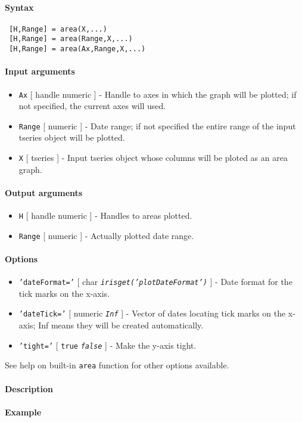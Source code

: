 


	\paragraph{Syntax}
 
 \begin{verbatim}
 [H,Range] = area(X,...)
 [H,Range] = area(Range,X,...)
 [H,Range] = area(Ax,Range,X,...)
 \end{verbatim}
 
 \paragraph{Input arguments}
 
 \begin{itemize}
 \item
   \texttt{Ax} {[} handle \textbar{} numeric {]} - Handle to axes in
   which the graph will be plotted; if not specified, the current axes
   will used.
 \item
   \texttt{Range} {[} numeric {]} - Date range; if not specified the
   entire range of the input tseries object will be plotted.
 \item
   \texttt{X} {[} tseries {]} - Input tseries object whose columns will
   be ploted as an area graph.
 \end{itemize}
 
 \paragraph{Output arguments}
 
 \begin{itemize}
 \item
   \texttt{H} {[} handle \textbar{} numeric {]} - Handles to areas
   plotted.
 \item
   \texttt{Range} {[} numeric {]} - Actually plotted date range.
 \end{itemize}
 
 \paragraph{Options}
 
 \begin{itemize}
 \item
   \texttt{'dateFormat='} {[} char \textbar{}
   \emph{\texttt{irisget('plotDateFormat')}} {]} - Date format for the
   tick marks on the x-axis.
 \item
   \texttt{'dateTick='} {[} numeric \textbar{} \emph{\texttt{Inf}} {]} -
   Vector of dates locating tick marks on the x-axis; Inf means they will
   be created automatically.
 \item
   \texttt{'tight='} {[} \texttt{true} \textbar{} \emph{\texttt{false}}
   {]} - Make the y-axis tight.
 \end{itemize}
 
 See help on built-in \texttt{area} function for other options available.
 
 \paragraph{Description}
 
 \paragraph{Example}


